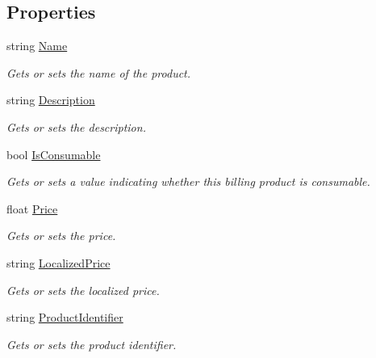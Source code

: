 \subsection*{Properties}
\begin{DoxyCompactItemize}
\item 
string \hyperlink{class_voxel_busters_1_1_native_plugins_1_1_billing_product_a7ee9065718e6628dc7791b756fa6c0f9}{Name}
\begin{DoxyCompactList}\small\item\em Gets or sets the name of the product. \end{DoxyCompactList}\item 
string \hyperlink{class_voxel_busters_1_1_native_plugins_1_1_billing_product_a34409fed9d39281ada2d7ec172a52f9b}{Description}
\begin{DoxyCompactList}\small\item\em Gets or sets the description. \end{DoxyCompactList}\item 
bool \hyperlink{class_voxel_busters_1_1_native_plugins_1_1_billing_product_a53a97d6cef9b971855e7ac9fe437fec9}{Is\+Consumable}
\begin{DoxyCompactList}\small\item\em Gets or sets a value indicating whether this billing product is consumable. \end{DoxyCompactList}\item 
float \hyperlink{class_voxel_busters_1_1_native_plugins_1_1_billing_product_af97474bf51c3b45301f3e01271baef3b}{Price}
\begin{DoxyCompactList}\small\item\em Gets or sets the price. \end{DoxyCompactList}\item 
string \hyperlink{class_voxel_busters_1_1_native_plugins_1_1_billing_product_a244402a53e71855c3657ff810ec10ce2}{Localized\+Price}
\begin{DoxyCompactList}\small\item\em Gets or sets the localized price. \end{DoxyCompactList}\item 
string \hyperlink{class_voxel_busters_1_1_native_plugins_1_1_billing_product_a318cd56e0b5431348b89762286588f95}{Product\+Identifier}
\begin{DoxyCompactList}\small\item\em Gets or sets the product identifier. \end{DoxyCompactList}\end{DoxyCompactItemize}


